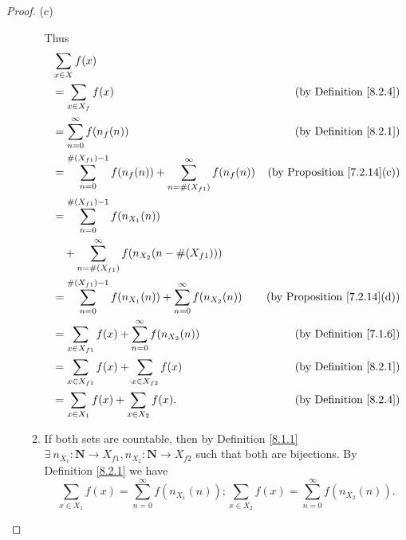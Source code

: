 \begin{proof}{(c)}
\begin{enumerate}[label=(\Roman*)]
\begin{enumerate}[label=(\roman*)]
                        Thus
                        \begin{align*}
                             & \sum_{x \in X} f(x)                                                                                                          \\
                             & = \sum_{x \in X_f} f(x)                                                            & \text{(by Definition \ref{8.2.4})}      \\
                             & = \sum_{n = 0}^\infty f(n_f(n))                                                    & \text{(by Definition \ref{8.2.1})}      \\
                             & = \sum_{n = 0}^{\#(X_{f1}) - 1} f(n_f(n)) + \sum_{n = \#(X_{f1})}^\infty f(n_f(n)) & \text{(by Proposition \ref{7.2.14}(c))} \\
                             & = \sum_{n = 0}^{\#(X_{f1}) - 1} f(n_{X_1}(n))                                                                                \\
                             & \quad + \sum_{n = \#(X_{f1})}^\infty f(n_{X_2}(n - \#(X_{f1})))                                                              \\
                             & = \sum_{n = 0}^{\#(X_{f1}) - 1} f(n_{X_1}(n)) + \sum_{n = 0}^\infty f(n_{X_2}(n))  & \text{(by Proposition \ref{7.2.14}(d))} \\
                             & = \sum_{x \in X_{f1}} f(x) + \sum_{n = 0}^\infty f(n_{X_2}(n))                     & \text{(by Definition \ref{7.1.6})}      \\
                             & = \sum_{x \in X_{f1}} f(x) + \sum_{x \in X_{f2}} f(x)                              & \text{(by Definition \ref{8.2.1})}      \\
                             & = \sum_{x \in X_1} f(x) + \sum_{x \in X_2} f(x).                                   & \text{(by Definition \ref{8.2.4})}
                        \end{align*}
                  \item If both sets are countable, then by Definition \ref{8.1.1} \(\exists\ n_{X_1} : \mathbf{N} \to X_{f1}, n_{X_2} : \mathbf{N} \to X_{f2}\) such that both are bijections.
                        By Definition \ref{8.2.1} we have
                        \[
                            \sum_{x \in X_1} f(x) = \sum_{n = 0}^\infty f(n_{X_1}(n)) ; \sum_{x \in X_2} f(x) = \sum_{n = 0}^\infty f(n_{X_2}(n)).
                        \]

\end{enumerate}
\end{enumerate}
\end{proof}
